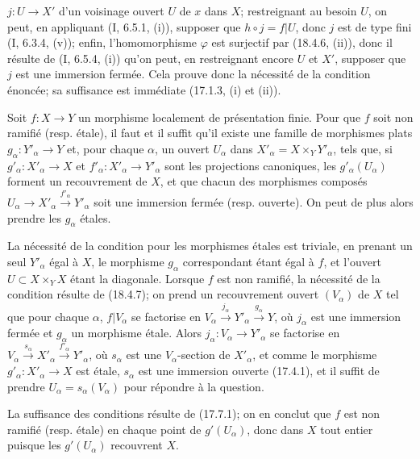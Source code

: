 
$j:U\to X'$ d'un voisinage ouvert $U$ de $x$ dans $X$; restreignant au besoin $U$, on peut, en appliquant (I, 6.5.1, (i)), supposer que $h\circ j=f|U$, donc $j$ est de type fini (I, 6.3.4, (v)); enfin, l'homomorphisme $\varphi$ est surjectif par (18.4.6, (ii)), donc il résulte de (I, 6.5.4, (i)) qu'on peut, en restreignant encore $U$ et $X'$, supposer que $j$ est une immersion fermée. Cela prouve donc la nécessité de la condition énoncée; sa suffisance est immédiate (17.1.3, (i) et (ii)).

\begin{corollary}[18.4.8]
\label{IV.18.4.8}
Soit $f:X\to Y$ un morphisme localement de présentation finie. Pour que $f$ soit non ramifié (resp. étale), il faut et il suffit qu'il existe une famille de morphismes plats $g_\alpha:Y'_\alpha\to Y$ et, pour chaque $\alpha$, un ouvert $U_\alpha$ dans $X'_\alpha=X\times_Y Y'_\alpha$, tels que, si $g'_\alpha:X'_\alpha\to X$ et $f'_\alpha:X'_\alpha\to Y'_\alpha$ sont les projections canoniques, les $g'_\alpha(U_\alpha)$ forment un recouvrement de $X$, et que chacun des morphismes composés $U_\alpha\to X'_\alpha\xrightarrow{f'_\alpha}Y'_\alpha$ soit une immersion fermée (resp. ouverte). On peut de plus alors prendre les $g_\alpha$ étales.
\end{corollary}

La nécessité de la condition pour les morphismes étales est triviale, en prenant un seul $Y'_\alpha$ égal à $X$, le morphisme $g_\alpha$ correspondant étant égal à $f$, et l'ouvert $U\subset X\times_Y X$ étant la diagonale. Lorsque $f$ est non ramifié, la nécessité de la condition résulte de (18.4.7); on prend un recouvrement ouvert $(V_\alpha)$ de $X$ tel que pour chaque $\alpha$, $f|V_\alpha$ se factorise en $V_\alpha\xrightarrow{j_\alpha}Y'_\alpha\xrightarrow{g_\alpha}Y$, où $j_\alpha$ est une immersion fermée et $g_\alpha$ un morphisme étale. Alors $j_\alpha:V_\alpha\to Y'_\alpha$ se factorise en $V_\alpha\xrightarrow{s_\alpha}X'_\alpha\xrightarrow{f'_\alpha}Y'_\alpha$, où $s_\alpha$ est une $V_\alpha$-section de $X'_\alpha$, et comme le morphisme $g'_\alpha:X'_\alpha\to X$ est étale, $s_\alpha$ est une immersion ouverte (17.4.1), et il suffit de prendre $U_\alpha=s_\alpha(V_\alpha)$ pour répondre à la question.

La suffisance des conditions résulte de (17.7.1); on en conclut que $f$ est non ramifié (resp. étale) en chaque point de $g'(U_\alpha)$, donc dans $X$ tout entier puisque les $g'(U_\alpha)$ recouvrent $X$.

